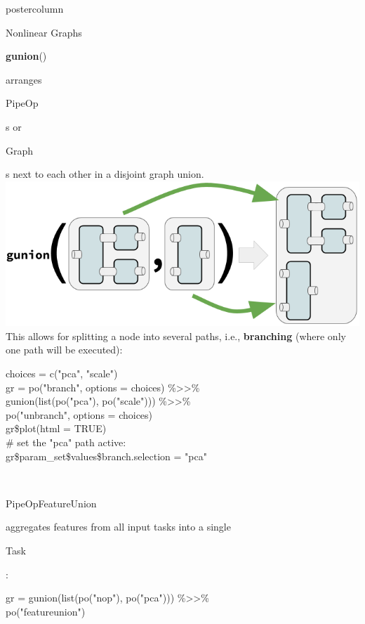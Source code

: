 \documentclass{beamer}
\newlength{\columnheight} %
\newcommand{\codeinline}[1]{\begin{codeboxinline}#1\end{codeboxinline}}
\begin{document}
\begin{frame}[fragile]{}
\begin{columns}
\begin{column}{.245\textwidth}
\begin{beamercolorbox}[center]{postercolumn}
				\begin{minipage}{.98\textwidth}
					\parbox[t][\columnheight]{\textwidth}{
            \begin{myblock}{Nonlinear Graphs}
              \codeinline{\textbf{gunion}()} arranges \codeinline{PipeOp}s or \codeinline{Graph}s next to each other in a disjoint graph union. \\
              \includegraphics[width=\textwidth]{img/gunion.png}
              This allows for splitting a node into several paths, i.e., \textbf{branching} (where only one path will be executed):
              \begin{codeboxexample}
						    {\footnotesize
                  choices = c("pca", "scale")\\
                  gr = po("branch", options = choices) \%>>\%\\
                  \hspace*{1ex} gunion(list(po("pca"), po("scale"))) \%>>\%\\
                  \hspace*{1ex} po("unbranch", options = choices)\\
                  gr\$plot(html = TRUE)\\
                  \# set the "pca" path active:\\
                  gr\$param\_set\$values\$branch.selection = "pca"}
					      \end{codeboxexample}
              \ \\
              \codeinline{PipeOpFeatureUnion} aggregates features from all input tasks into a single \codeinline{Task}:
              \begin{codeboxexample}
						    {\footnotesize
                  gr = gunion(list(po("nop"), po("pca"))) \%>>\%\\
                  \hspace*{1ex} po("featureunion")}

\end{codeboxexample}
\end{myblock}}
\end{minipage}
\end{beamercolorbox}
\end{column}
\end{columns}
\end{frame}
\end{document}
